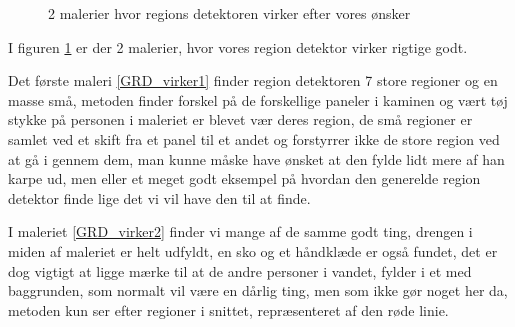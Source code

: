 \begin{figure}[!h]
		\hspace{1em}
        \caption[]{2 malerier hvor regions detektoren virker efter vores ønsker}
     \label{generelde_region_detektor_virker}
\end{figure}

I figuren \ref{generelde_region_detektor_virker} er der 2 malerier, hvor
vores region detektor virker rigtige godt. 

Det første maleri \ref{GRD_virker1} finder region detektoren 7 store
regioner og en masse små, metoden finder forskel på de forskellige
paneler i kaminen og vært tøj stykke på personen i maleriet er blevet
vær deres region, de små regioner er samlet ved et skift fra et panel
til et andet og forstyrrer ikke de store region ved at gå i gennem dem,
man kunne måske have ønsket at den fylde lidt mere af han karpe ud, men
eller et meget godt eksempel på hvordan den generelde region detektor
finde lige det vi vil have den til at finde. 

I maleriet \ref{GRD_virker2} finder vi mange af de samme
godt ting, drengen i miden af maleriet er helt udfyldt, en sko og et
håndklæde er også fundet, det er dog vigtigt at ligge mærke til at de
andre personer i vandet, fylder i et med baggrunden, som normalt vil
være en dårlig ting, men som ikke gør noget her da, metoden kun ser
efter regioner i snittet, repræsenteret af den røde linie.
 
